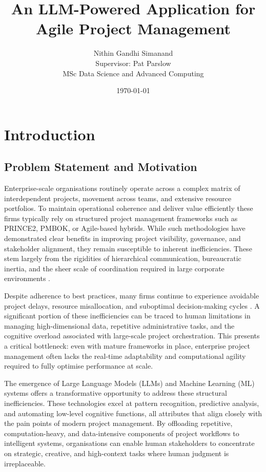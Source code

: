 \documentclass{report}
\title{\textbf{An LLM-Powered Application for Agile Project Management}}
\author{Nithin Gandhi Simanand \\ Supervisor: Pat Parslow \\ MSc Data Science and Advanced Computing}
\date{\today}
\begin{document}
\maketitle

\tableofcontents

\newpage

\chapter{Introduction}  %
\section{Problem Statement and Motivation}

Enterprise-scale organisations routinely operate across a complex matrix of interdependent projects, movement across teams, and extensive resource portfolios.
To maintain operational coherence and deliver value efficiently these firms typically rely on structured project management frameworks such as PRINCE2, PMBOK, or Agile-based hybrids. 
While such methodologies have demonstrated clear benefits in improving project visibility, governance, and stakeholder alignment, they remain susceptible to inherent inefficiencies. 
These stem largely from the rigidities of hierarchical communication, bureaucratic inertia, and the sheer scale of coordination required in large corporate environments \parencite{pricaEnhancingProjectEfficiency2025}.

Despite adherence to best practices, many firms continue to experience avoidable project delays, resource misallocation, and suboptimal decision-making cycles \parencite{mankinsTurningGreatStrategy2005}. 
A significant portion of these inefficiencies can be traced to human limitations in managing high-dimensional data, repetitive administrative tasks, and the cognitive overload associated with large-scale project orchestration. 
This presents a critical bottleneck: even with mature frameworks in place, enterprise project management often lacks the real-time adaptability and computational agility required to fully optimise performance at scale.

The emergence of Large Language Models (LLMs) and Machine Learning (ML) systems offers a transformative opportunity to address these structural inefficiencies. 
These technologies excel at pattern recognition, predictive analysis, and automating low-level cognitive functions, all attributes that align closely with the pain points of modern project management. 
By offloading repetitive, computation-heavy, and data-intensive components of project workflows to intelligent systems, organisations can enable human stakeholders to concentrate on strategic, creative, and high-context tasks where human judgment is irreplaceable.
\end{document}
